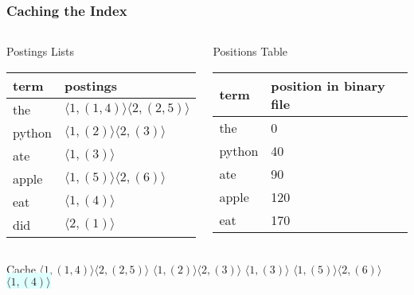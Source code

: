 \documentclass{beamer}
\begin{document}
\begin{frame}
  \frametitle{Caching the Index}

  \begin{columns}


    \begin{block}{Postings Lists}
      \begin{tabular}{ l | l }
        term & postings \\ \hline
        the & $ \langle 1,(1,4) \rangle \langle 2,(2,5) \rangle $ \\
        python & $ \langle 1,(2) \rangle \langle 2,(3) \rangle $ \\
        ate & $ \langle 1,(3) \rangle $ \\
        apple & $ \langle 1,(5) \rangle \langle 2,(6) \rangle $ \\
        \rowcolor{LightCyan}
        eat & $ \langle 1,(4) \rangle $ \\
        did & $ \langle 2,(1) \rangle $ \\
      \end{tabular}
    \end{block}


    \begin{block}{Positions Table}
      \begin{tabular}{ l | l }
        term & position in binary file \\ \hline
        the & 0 \\
        python & 40 \\
        ate & 90 \\
        apple & 120 \\
        \rowcolor{LightCyan}
        eat & 170 \\
      \end{tabular}
    \end{block}
    
  \end{columns}

  \begin{block}{Cache}
    $ \langle 1,(1,4) \rangle \langle 2,(2,5) \rangle $
    $ \langle 1,(2) \rangle \langle 2,(3) \rangle $
    $ \langle 1,(3) \rangle $
    $ \langle 1,(5) \rangle \langle 2,(6) \rangle $
    \colorbox{LightCyan}{$ \langle 1,(4) \rangle $}
  \end{block}
\end{frame}
\end{document}

